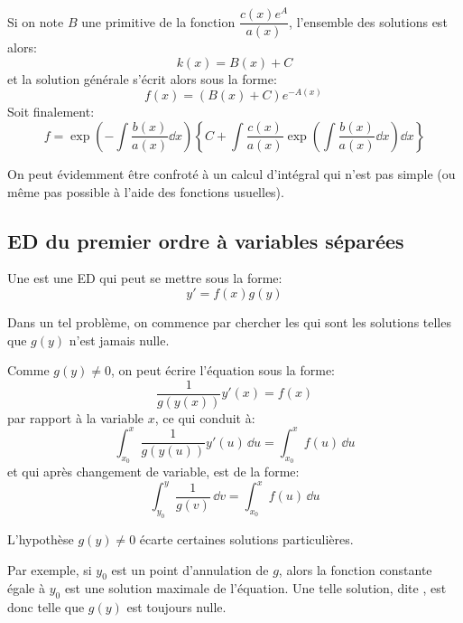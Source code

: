 Si on note $B$ une primitive de la fonction $\dfrac{c(x) e^A}{a(x)}$, l'ensemble des solutions est alors:
\begin{equation}
    k(x) = B(x) + C
\end{equation}
et la solution générale s'écrit alors sous la forme:
\begin{equation}
    f(x) = (B(x) + C) e^{-A(x)}\,
\end{equation}
Soit finalement:
\begin{equation}
    f = \exp\left( -\int\frac{b(x)}{a(x)}\dd x \right) \left\{ C + \int \frac{c(x)}{a(x)} \exp\left(\int \frac{b(x)}{a(x)}\dd x\right)\dd x \right\}
\end{equation}

On peut évidemment être confroté à un calcul d'intégral qui n'est pas simple
(ou même pas possible à l'aide des fonctions usuelles).



\medskip
\subsection{ED du premier ordre à variables séparées}

Une  est une 
ED qui peut se mettre sous la forme:
\begin{equation}
    y' = f(x)g(y)
\end{equation}

\medskip
Dans un tel problème, on commence par chercher les 
qui sont les solutions telles que $g(y)$ n'est jamais nulle. 

Comme $g(y)\ne0$, on peut écrire l'équation sous la forme:
\begin{equation}
    \frac{1}{g(y(x))} y'(x) = f(x)
\end{equation}
par rapport à la variable $x$, ce qui conduit à:
\begin{equation}
    \int_{x_0}^x \frac{1}{g(y(u))}y'(u) \, \dd u = \int_{x_0}^x f(u) \, \dd u 
\end{equation}
et qui après changement de variable, est de la forme:
\begin{equation}
    \int_{y_0}^y \frac{1}{g(v)} \, \dd v = \int_{x_0}^x f(u) \, \dd u 
\end{equation}

\medskip
L'hypothèse $g(y)\ne0$ écarte certaines solutions particulières.

Par exemple, si $y_0$ est un point d'annulation de $g$, alors la fonction constante 
égale à $y_0$ est une solution maximale de l'équation.
Une telle solution, dite , est donc telle que $g(y)$ est toujours nulle.

